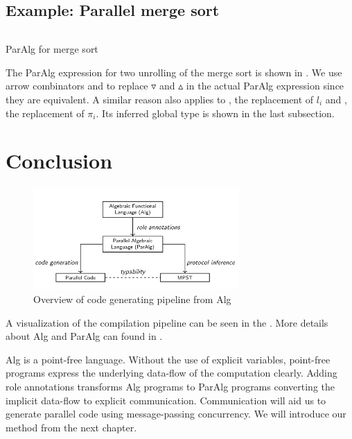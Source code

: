 \subsection{Example: Parallel merge sort}
\begin{listing}[ht]
\inputminted{text}{project/ms.txt}
\caption{ParAlg for merge sort}
\label{project:code:mspar}
\end{listing}

The ParAlg expression for two unrolling of the merge sort is shown in . We use arrow combinators \hask{&&&} and \hask{|||} to replace $\triangledown$ and $\vartriangle$ in the actual ParAlg expression since they are equivalent. A similar reason also applies to , the replacement of $l_i$ and , the replacement of $\pi_i$. Its inferred global type is shown in the last subsection.

\section{Conclusion}
\begin{figure}[ht]
    \centering
    \includegraphics[width=0.7\textwidth]{project/pipeline.png}
    \caption{Overview of code generating pipeline from Alg\cite{castroAlgebraicMultipartyProtocol}}
    \label{project:fig:pipeline}
\end{figure}
A visualization of the compilation pipeline can be seen in the . More details about Alg and ParAlg can found in \cite{castroAlgebraicMultipartyProtocol}.

Alg is a point-free language. Without the use of explicit variables, point-free programs express the underlying data-flow of the computation clearly. Adding role annotations transforms Alg programs to ParAlg programs converting the implicit data-flow to explicit communication. Communication will aid us to generate parallel code using message-passing concurrency. We will introduce our method from the next chapter.
